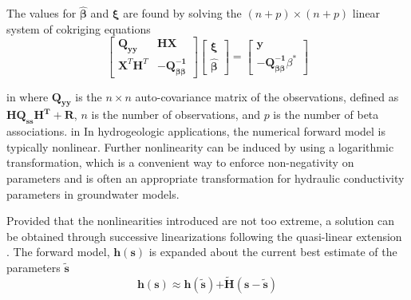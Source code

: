 \documentclass[11pt,oneside,onecolumn]{usgsreport}
\begin{document}
\begin{appendix}
The values for $\mathbf{\hat{\beta}}$ and $\mathbf{\xi}$ are found
by solving the $(n+p)\times(n+p)$ linear system of cokriging equations
\begin{equation}
\left[\begin{array}{cc}
\mathbf{Q_{yy}} & \mathbf{HX}\\
\mathbf{X}^{T}\mathbf{H}^{T} & \mathbf{-}\mathbf{Q_{\beta\beta}^{-1}}
\end{array}\right]\left[\begin{array}{c}
\mathbf{\xi}\\
\mathbf{\hat{\beta}}
\end{array}\right]=\left[\begin{array}{c}
\mathbf{y}\\
\mathbf{-}\mathbf{Q_{\beta\beta}^{-1}}\beta^{*}
\end{array}\right]\label{eq:cokriging-1}
\end{equation}

 in
where $\mathbf{Q_{yy}}$ is the $n\times n$ auto-covariance matrix
of the observations, defined as $\mathbf{HQ_{ss}H^{\mathbf{T}}+R}$,
$n$ is the number of observations, and $p$ is the number of beta
associations.
 in
In hydrogeologic applications, the numerical forward model is typically
nonlinear. Further nonlinearity can be induced by using a logarithmic
transformation, which is a convenient way to enforce non-negativity
on parameters and is often an appropriate transformation for hydraulic
conductivity parameters in groundwater models.

Provided that the nonlinearities introduced are not too extreme, a
solution can be obtained through successive linearizations following
the quasi-linear extension \citep{Kitanidis1995}. The forward model,
$\mathbf{h(s)}$ is expanded about the current best estimate of the
parameters $\mathbf{\tilde{s}}$
\[
\mathbf{h}(\mathbf{s})\mathbf{\approx h}(\mathbf{\tilde{s}})\mathbf{+\tilde{H}}(\mathbf{s-\tilde{s}})
\]


\end{appendix}
\end{document}
